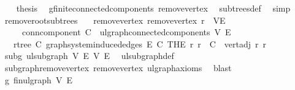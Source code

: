 \begin{isabellebody}
\ \ \isamarkupfalse%
\ {\isacharquery}{\kern0pt}thesis\ \isamarkupfalse%
\ g{\isacharprime}{\kern0pt}{\isachardot}{\kern0pt}finite{\isacharunderscore}{\kern0pt}connected{\isacharunderscore}{\kern0pt}components\ remove{\isacharunderscore}{\kern0pt}vertex\ \isamarkupfalse%
\ subtrees{\isacharunderscore}{\kern0pt}def\ \isamarkupfalse%
\ simp\isanewline
{}\isamarkupfalse%
%
\endisatagproof
{\isafoldproof}%
%
\isadelimproof
\isanewline
%
\endisadelimproof
\isanewline
{}\isamarkupfalse%
\ remove{\isacharunderscore}{\kern0pt}root{\isacharunderscore}{\kern0pt}subtrees{\isacharcolon}{\kern0pt}\isanewline
\ \ \ remove{\isacharunderscore}{\kern0pt}vertex{\isacharcolon}{\kern0pt}\ {\isachardoublequoteopen}remove{\isacharunderscore}{\kern0pt}vertex\ r\ {\isacharequal}{\kern0pt}\ {\isacharparenleft}{\kern0pt}V{\isacharprime}{\kern0pt}{\isacharcomma}{\kern0pt}E{\isacharprime}{\kern0pt}{\isacharparenright}{\kern0pt}{\isachardoublequoteclose}\isanewline
\ \ \ \ \ conn{\isacharunderscore}{\kern0pt}component{\isacharcolon}{\kern0pt}\ {\isachardoublequoteopen}C\ {\isasymin}\ ulgraph{\isachardot}{\kern0pt}connected{\isacharunderscore}{\kern0pt}components\ V{\isacharprime}{\kern0pt}\ E{\isacharprime}{\kern0pt}{\isachardoublequoteclose}\isanewline
\ \ \ {\isachardoublequoteopen}rtree\ C\ {\isacharparenleft}{\kern0pt}graph{\isacharunderscore}{\kern0pt}system{\isachardot}{\kern0pt}induced{\isacharunderscore}{\kern0pt}edges\ E{\isacharprime}{\kern0pt}\ C{\isacharparenright}{\kern0pt}\ {\isacharparenleft}{\kern0pt}THE\ r{\isacharprime}{\kern0pt}{\isachardot}{\kern0pt}\ r{\isacharprime}{\kern0pt}\ {\isasymin}\ C\ {\isasymand}\ vert{\isacharunderscore}{\kern0pt}adj\ r\ r{\isacharprime}{\kern0pt}{\isacharparenright}{\kern0pt}{\isachardoublequoteclose}\isanewline
%
\isadelimproof
%
\endisadelimproof
%
\isatagproof
{}\isamarkupfalse%
{\isacharminus}{\kern0pt}\isanewline
\ \ \isamarkupfalse%
\ subg{\isacharcolon}{\kern0pt}\ ulsubgraph\ V{\isacharprime}{\kern0pt}\ E{\isacharprime}{\kern0pt}\ V\ E\ \isamarkupfalse%
\ ulsubgraph{\isacharunderscore}{\kern0pt}def\ \isamarkupfalse%
\ subgraph{\isacharunderscore}{\kern0pt}remove{\isacharunderscore}{\kern0pt}vertex\ remove{\isacharunderscore}{\kern0pt}vertex\ ulgraph{\isacharunderscore}{\kern0pt}axioms\ \isamarkupfalse%
\ blast\isanewline
\ \ \isamarkupfalse%
\ g{\isacharprime}{\kern0pt}{\isacharcolon}{\kern0pt}\ fin{\isacharunderscore}{\kern0pt}ulgraph\ V{\isacharprime}{\kern0pt}\ E{\isacharprime}{\kern0pt}\isanewline

\end{isabellebody}
